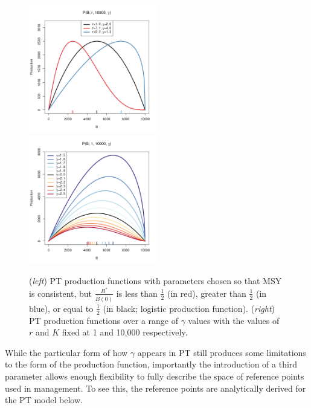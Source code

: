 \documentclass[12pt]{article}
\begin{document}
\begin{figure}[h!]
	\includegraphics[width=0.5\textwidth]{./plots/srr1.1.png}	
	\includegraphics[width=0.5\textwidth]{./plots/srr2.png}
	\caption{\label{srrPT}
	(\emph{left}) PT production functions with parameters chosen so that MSY is consistent, but $\frac{B^*}{\bar B(0)}$ is less than $\frac{1}{2}$ (in red), greater than $\frac{1}{2}$ (in blue), or equal to $\frac{1}{2}$ (in black; logistic production function).
	(\emph{right}) PT production functions over a range of $\gamma$ values with the values of $r$ and $K$ fixed at 1 and 10,000 respectively.  
	}
\end{figure}

%

%
While the particular form of how $\gamma$ appears in PT still produces some 
limitations to the form of the production function, importantly the 
introduction of a third parameter allows enough flexibility to fully describe 
the space of reference points used in management. To see this, the reference 
points are analytically derived for the PT model below. %
\end{document}
